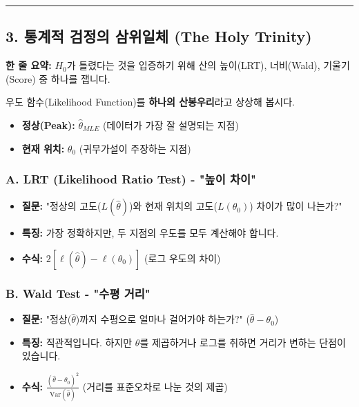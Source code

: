 \documentclass[11pt,a4paper]{book}
\theoremstyle{definition}
\begin{document}
\vspace{0.5cm}\hrule\vspace{0.5cm}

\subsection{3. 통계적 검정의 삼위일체 (The Holy Trinity)}


\begin{conceptbox}[title={개념 3: 우도 산(Mountain) 등반하기}]
\textbf{한 줄 요약:} $H_0$가 틀렸다는 것을 입증하기 위해 산의 높이(LRT), 너비(Wald), 기울기(Score) 중 하나를 잽니다.
\end{conceptbox}

우도 함수(Likelihood Function)를 \textbf{하나의 산봉우리}라고 상상해 봅시다.
\begin{itemize}
    \item \textbf{정상(Peak):} $\hat{\theta}_{MLE}$ (데이터가 가장 잘 설명되는 지점)
    \item \textbf{현재 위치:} $\theta_0$ (귀무가설이 주장하는 지점)
\end{itemize}

\subsubsection*{A. LRT (Likelihood Ratio Test) - "높이 차이"}
\begin{itemize}
    \item \textbf{질문:} "정상의 고도($L(\hat{\theta})$)와 현재 위치의 고도($L(\theta_0)$) 차이가 많이 나는가?"
    \item \textbf{특징:} 가장 정확하지만, 두 지점의 우도를 모두 계산해야 합니다.
    \item \textbf{수식:} $2 [\ell(\hat{\theta}) - \ell(\theta_0)]$ (로그 우도의 차이)
\end{itemize}

\subsubsection*{B. Wald Test - "수평 거리"}
\begin{itemize}
    \item \textbf{질문:} "정상($\hat{\theta}$)까지 수평으로 얼마나 걸어가야 하는가?" ($\hat{\theta} - \theta_0$)
    \item \textbf{특징:} 직관적입니다. 하지만 $\theta$를 제곱하거나 로그를 취하면 거리가 변하는 단점이 있습니다.
    \item \textbf{수식:} $\frac{(\hat{\theta} - \theta_0)^2}{\text{Var}(\hat{\theta})}$ (거리를 표준오차로 나눈 것의 제곱)
\end{itemize}
\end{document}
